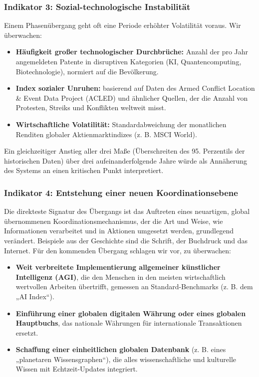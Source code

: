 \documentclass[12pt,a4paper]{article}
\theoremstyle{remark}
\begin{document}
	\subsubsection{Indikator 3: Sozial-technologische Instabilität}
	
	Einem Phasenübergang geht oft eine Periode erhöhter Volatilität voraus. Wir überwachen:
	
	\begin{itemize}
		\item \textbf{Häufigkeit großer technologischer Durchbrüche:} Anzahl der pro Jahr angemeldeten Patente in disruptiven Kategorien (KI, Quantencomputing, Biotechnologie), normiert auf die Bevölkerung.
		\item \textbf{Index sozialer Unruhen:} basierend auf Daten des Armed Conflict Location \& Event Data Project (ACLED) und ähnlicher Quellen, der die Anzahl von Protesten, Streiks und Konflikten weltweit misst.
		\item \textbf{Wirtschaftliche Volatilität:} Standardabweichung der monatlichen Renditen globaler Aktienmarktindizes (z. B. MSCI World).
	\end{itemize}
	
	Ein gleichzeitiger Anstieg aller drei Maße (Überschreiten des 95. Perzentils der historischen Daten) über drei aufeinanderfolgende Jahre würde als Annäherung des Systems an einen kritischen Punkt interpretiert.
	
	\subsubsection{Indikator 4: Entstehung einer neuen Koordinationsebene}
	
	Die direkteste Signatur des Übergangs ist das Auftreten eines neuartigen, global übernommenen Koordinationsmechanismus, der die Art und Weise, wie Informationen verarbeitet und in Aktionen umgesetzt werden, grundlegend verändert. Beispiele aus der Geschichte sind die Schrift, der Buchdruck und das Internet. Für den kommenden Übergang schlagen wir vor, zu überwachen:
	
	\begin{itemize}
		\item \textbf{Weit verbreitete Implementierung allgemeiner künstlicher Intelligenz (AGI)}, die den Menschen in den meisten wirtschaftlich wertvollen Arbeiten übertrifft, gemessen an Standard-Benchmarks (z. B. dem „AI Index“).
		\item \textbf{Einführung einer globalen digitalen Währung oder eines globalen Hauptbuchs}, das nationale Währungen für internationale Transaktionen ersetzt.
		\item \textbf{Schaffung einer einheitlichen globalen Datenbank} (z. B. eines „planetaren Wissensgraphen“), die alles wissenschaftliche und kulturelle Wissen mit Echtzeit-Updates integriert.
	\end{itemize}
	
\end{document}

